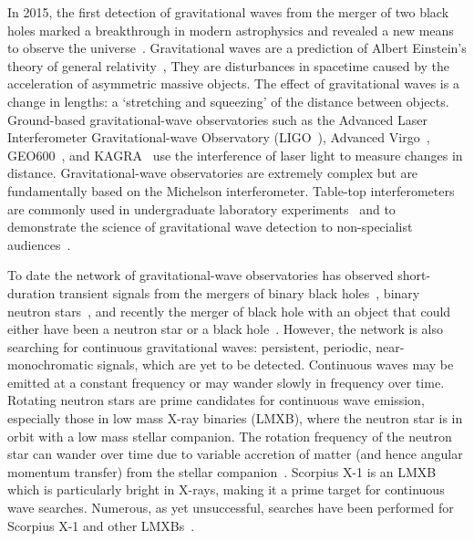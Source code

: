\documentclass[paper-main.tex]{subfiles}
\begin{document}
In 2015, the first detection of gravitational waves from the merger of two black holes marked a breakthrough in modern astrophysics and revealed a new means to observe the universe~\cite{GW150914}.
Gravitational waves are a prediction of Albert Einstein's theory of general relativity~\cite{Einstein:1916}, 
They are disturbances in spacetime caused by the acceleration of asymmetric massive objects.
The effect of gravitational waves is a change in lengths: a `stretching and squeezing' of the distance between objects. 
Ground-based gravitational-wave observatories such as the Advanced Laser Interferometer Gravitational-wave Observatory (LIGO~\cite{AdvancedLIGO:2015}), Advanced Virgo~\cite{AdvancedVirgo:2015}, GEO600~\cite{GEO600:2010}, and KAGRA~\cite{KAGRA:2013} use the interference of laser light to measure changes in distance. 
Gravitational-wave observatories are extremely complex but are fundamentally based on the Michelson interferometer. 
Table-top interferometers are commonly used in undergraduate laboratory experiments~\cite{UgoliniEtAl:2019} and to demonstrate the science of gravitational wave detection to non-specialist audiences~\cite{ThorLabsIFO,NikhefIFO,AMIGO:online,TTExhibit:2020,LIGOIFOGlue,LIGOIFOMagnets}.


To date the network of gravitational-wave observatories has observed short-duration transient signals from the mergers of binary black holes~\cite{GW150914,GW151226,GW170104,GW170814,GW190521,GWTC-1:2018}, binary neutron stars~\cite{GW170817,GW170817multi,GW190425,GWTC-1:2018}, and recently the merger of black hole with an object that could either have been a neutron star or a black hole~\cite{GW190814}. 
However, the network is also searching for continuous gravitational waves: persistent, periodic, near-monochromatic signals, which are yet to be detected. 
Continuous waves may be emitted at a constant frequency or may wander slowly in frequency over time. 
Rotating neutron stars are prime candidates for continuous wave emission, especially those in low mass X-ray binaries (LMXB), where the neutron star is in orbit with a low mass stellar companion.
The rotation frequency of the neutron star can wander over time due to variable accretion of matter (and hence angular momentum transfer) from the stellar companion~\cite{xraybinaries:1997}. 
Scorpius X-1 is an LMXB which is particularly bright in X-rays, making it a prime target for continuous wave searches. %
Numerous, as yet unsuccessful, searches have been performed for Scorpius X-1 and other LMXBs~\cite{ScoX1O2Viterbi:2019, ScoX1ViterbiO1:2017, RadiometerO1O2:2019, SearchRadiometerO1:2017, SearchCrossCorrO1:2017, ScoX1ViterbiO1:2017, SearchTwoSpecS6:2017, MiddletonEtAlO2LMXBs:2020}. 
\end{document}
